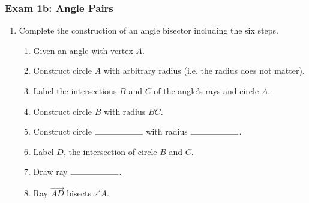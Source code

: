 \documentclass[12pt, oneside]{article}
\begin{document}
\subsubsection*{Exam 1b: Angle Pairs}
  \vspace{0.5cm}
  \begin{enumerate}

  \item Complete the construction of an angle bisector including the six steps.
    \begin{enumerate}
      \item Given an angle with vertex $A$.
      \item Construct circle $A$ with arbitrary radius (i.e. the radius does not matter).
      \item Label the intersections $B$ and $C$ of the angle's rays and circle $A$.
      \item Construct circle $B$  with radius $BC$. \bigskip
      \item Construct circle $\rule{2cm}{0.15mm}$  with radius $\rule{2cm}{0.15mm}$. \bigskip
      \item Label $D$, the intersection of circle $B$ and $C$. \bigskip
      \item Draw ray $\rule{2cm}{0.15mm}$.
      \bigskip
      \item Ray $\overrightarrow {AD}$ bisects $\angle A$.
    \end{enumerate}
    \vspace{3cm}
    \begin{center}
    \end{center}
\newpage


\end{enumerate}
\end{document}
